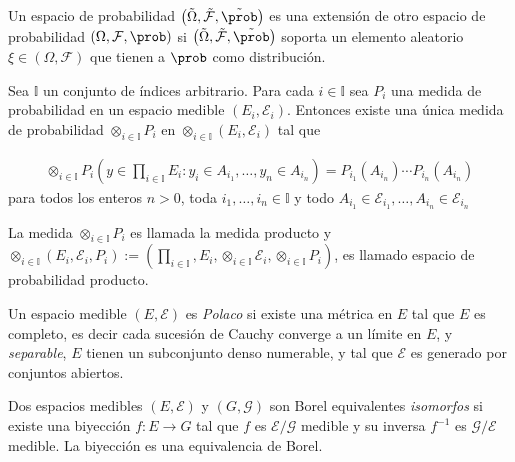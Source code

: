 \begin{Def}
Un espacio de probabilidad $\left(\tilde{\Omega},\tilde{\mathcal{F}},\tilde{\prob}\right)$ es una extensi\'on de otro espacio de probabilidad $\left(\Omega,\mathcal{F},\prob\right)$ si $\left(\tilde{\Omega},\tilde{\mathcal{F}},\tilde{\prob}\right)$ soporta un elemento aleatorio $\xi\in\left(\Omega,\mathcal{F}\right)$ que tienen a $\prob$ como distribuci\'on.
\end{Def}

\begin{Teo}
Sea $\mathbb{I}$ un conjunto de \'indices arbitrario. Para cada $i\in\mathbb{I}$ sea $P_{i}$ una medida de probabilidad en un espacio medible $\left(E_{i},\mathcal{E}_{i}\right)$. Entonces existe una \'unica medida de probabilidad $\otimes_{i\in\mathbb{I}}P_{i}$ en $\otimes_{i\in\mathbb{I}}\left(E_{i},\mathcal{E}_{i}\right)$ tal que 

\begin{eqnarray*}
\otimes_{i\in\mathbb{I}}P_{i}\left(y\in\prod_{i\in\mathbb{I}}E_{i}:y_{i}\in A_{i_{1}},\ldots,y_{n}\in A_{i_{n}}\right)=P_{i_{1}}\left(A_{i_{n}}\right)\cdots P_{i_{n}}\left(A_{i_{n}}\right)
\end{eqnarray*}
para todos los enteros $n>0$, toda $i_{1},\ldots,i_{n}\in\mathbb{I}$ y todo $A_{i_{1}}\in\mathcal{E}_{i_{1}},\ldots,A_{i_{n}}\in\mathcal{E}_{i_{n}}$
\end{Teo}

La medida $\otimes_{i\in\mathbb{I}}P_{i}$ es llamada la medida producto y $\otimes_{i\in\mathbb{I}}\left(E_{i},\mathcal{E}_{i},P_{i}\right):=\left(\prod_{i\in\mathbb{I}},E_{i},\otimes_{i\in\mathbb{I}}\mathcal{E}_{i},\otimes_{i\in\mathbb{I}}P_{i}\right)$, es llamado espacio de probabilidad producto.


\begin{Def}
Un espacio medible $\left(E,\mathcal{E}\right)$ es \textit{Polaco} si existe una m\'etrica en $E$ tal que $E$ es completo, es decir cada sucesi\'on de Cauchy converge a un l\'imite en $E$, y \textit{separable}, $E$ tienen un subconjunto denso numerable, y tal que $\mathcal{E}$ es generado por conjuntos abiertos.
\end{Def}


\begin{Def}
Dos espacios medibles $\left(E,\mathcal{E}\right)$ y $\left(G,\mathcal{G}\right)$ son Borel equivalentes \textit{isomorfos} si existe una biyecci\'on $f:E\rightarrow G$ tal que $f$ es $\mathcal{E}/\mathcal{G}$ medible y su inversa $f^{-1}$ es $\mathcal{G}/\mathcal{E}$ medible. La biyecci\'on es una equivalencia de Borel.
\end{Def}

